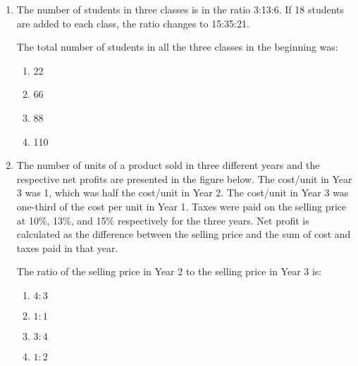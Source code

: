 \documentclass[journal,12pt,onecolumn]{IEEEtran}
\theoremstyle{remark}
\begin{document}
\begin{enumerate}
\begin{enumerate}
        \item  \begin{figure}[H]
        \centering
    \end{figure}
       
        \item  \begin{figure}[H]
        \centering
    \end{figure}
       
    \end{enumerate}

    \item The number of students in three classes is in the ratio 3:13:6. If 18 students are added to each class, the ratio changes to 15:35:21.
    
    The total number of students in all the three classes in the beginning was:
    \begin{enumerate}
        \item 22
        \item 66
        \item 88
        \item 110
    \end{enumerate}

    \item The number of units of a product sold in three different years and the respective net profits are presented in the figure below. The cost/unit in Year 3 was 1, which was half the cost/unit in Year 2. The cost/unit in Year 3 was one-third of the cost per unit in Year 1. Taxes were paid on the selling price at 10\%, 13\%, and 15\% respectively for the three years. Net profit is calculated as the difference between the selling price and the sum of cost and taxes paid in that year.
    
   \begin{figure}[H]
        \centering
    \end{figure}
       
    
    The ratio of the selling price in Year 2 to the selling price in Year 3 is:
    \begin{enumerate}
        \item $4:3$
        \item $1:1$
        \item $3:4$
        \item $1:2$
    \end{enumerate}


\end{enumerate}
\end{document}
